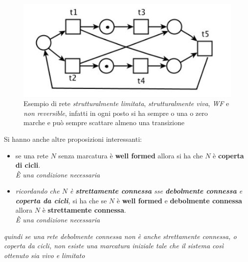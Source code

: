 \documentclass[a4paper,12pt, oneside]{book}
\begin{document}
\begin{esempio}
\begin{figure}[H]
  \end{figure}
  \begin{figure}[H]
    \centering
    \includegraphics[scale = 0.55]{img/as3.jpg}
    \caption{Esempio di rete \emph{strutturalmente limitata},
      \emph{strutturalmente viva}, \emph{WF} e \emph{non reversible}, infatti in
      ogni posto si ha sempre o una o zero marche e può sempre scattare almeno una
      transizione}
  \end{figure}
\end{esempio}
Si hanno anche altre proposizioni interessanti:
\begin{itemize}
  \item se una rete $N$ senza marcatura è \textbf{well formed} allora si ha che
  $N$ è \textbf{coperta di cicli}.\\
  \textit{È una condizione necessaria}
  \item \textit{ricordando che $N$ è \textbf{strettamente connessa} sse
    \textbf{debolmente connessa} e \textbf{coperta da cicli},} si ha che se $N$ è
  \textbf{well formed} e \textbf{debolmente connessa} allora $N$ è
  \textbf{strettamente connessa}.\\
  \textit{È una condizione necessaria}
\end{itemize}
\textit{quindi se una rete\emph{ debolmente connessa} non è anche
  \emph{strettamente connessa}, o \emph{coperta da cicli}, non esiste una
  marcatura iniziale tale che il sistema così ottenuto sia \emph{vivo} e
  \emph{limitato}}
\end{document}
